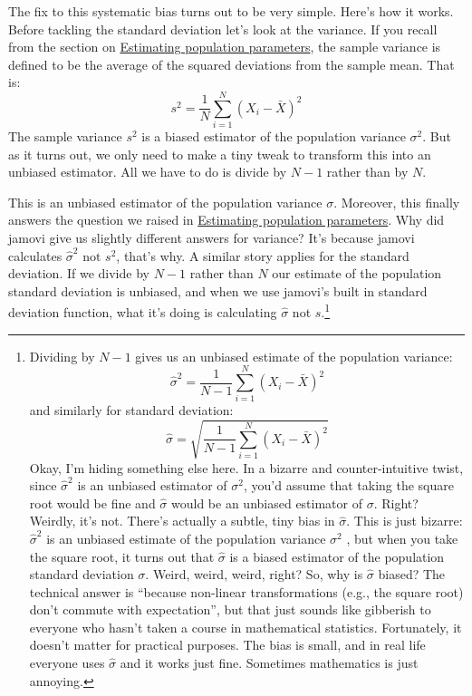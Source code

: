 \documentclass[
  a4paper,
]{book}
\begin{document}
The fix to this systematic bias turns out to be very simple. Here's how
it works. Before tackling the standard deviation let's look at the
variance. If you recall from the section on
\protect\hyperlink{estimating-population-parameters}{Estimating
population parameters}, the sample variance is defined to be the average
of the squared deviations from the sample mean. That is:
\[s^2=\frac{1}{N} \sum_{i=1}^{N}(X_i-\bar{X})^2\] The sample variance
\(s^2\) is a biased estimator of the population variance \(\sigma^2\).
But as it turns out, we only need to make a tiny tweak to transform this
into an unbiased estimator. All we have to do is divide by \(N-1\)
rather than by \(N\).

This is an unbiased estimator of the population variance \(\sigma\).
Moreover, this finally answers the question we raised in
\protect\hyperlink{estimating-population-parameters}{Estimating
population parameters}. Why did jamovi give us slightly different
answers for variance? It's because jamovi calculates
\(\hat{\sigma}^2 \text{ not } s^2\), that's why. A similar story applies
for the standard deviation. If we divide by \(N - 1\) rather than \(N\)
our estimate of the population standard deviation is unbiased, and when
we use jamovi's built in standard deviation function, what it's doing is
calculating \(\hat{\sigma}\) not \(s\).\footnote{Dividing by \(N-1\)
  gives us an unbiased estimate of the population variance:
  \[\hat{\sigma}^2=\frac{1}{N-1}\sum_{i=1}^{N}(X_i - \bar{X})^2\] and
  similarly for standard deviation:
  \[\hat{\sigma}=\sqrt{\frac{1}{N-1}\sum_{i=1}^{N}(X_i-\bar{X})^2}\]
  Okay, I'm hiding something else here. In a bizarre and
  counter-intuitive twist, since \(\hat{\sigma}^2\) is an unbiased
  estimator of \(\sigma^2\), you'd assume that taking the square root
  would be fine and \(\hat{\sigma}\) would be an unbiased estimator of
  \(\sigma\). Right? Weirdly, it's not. There's actually a subtle, tiny
  bias in \(\hat{\sigma}\). This is just bizarre: \(\hat{\sigma}^2\) is
  an unbiased estimate of the population variance \(\sigma^2\) , but
  when you take the square root, it turns out that \(\hat{\sigma}\) is a
  biased estimator of the population standard deviation \(\sigma\).
  Weird, weird, weird, right? So, why is \(\hat{\sigma}\) biased? The
  technical answer is ``because non-linear transformations (e.g., the
  square root) don't commute with expectation'', but that just sounds
  like gibberish to everyone who hasn't taken a course in mathematical
  statistics. Fortunately, it doesn't matter for practical purposes. The
  bias is small, and in real life everyone uses \(\hat{\sigma}\) and it
  works just fine. Sometimes mathematics is just annoying.}
\end{document}
